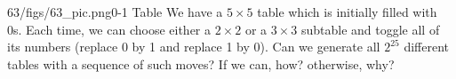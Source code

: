 \begin{problem}{63/figs/63_pic.png}{0-1 Table} We have a $5 \times 5$ table which is initially filled with 0s. Each time, we can choose either a $2 \times 2$ or a $3 \times 3$ subtable and toggle all of its numbers (replace 0 by 1 and replace 1 by 0). Can we generate all $2^{25}$ different tables with a sequence of such moves? If we can, how? otherwise, why?
\end{problem}